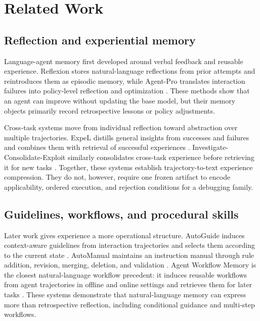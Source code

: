 \section{Related Work}
\label{sec:related_work}

\subsection{Reflection and experiential memory}
\label{sec:related_reflection}

Language-agent memory first developed around verbal feedback and reusable experience. Reflexion stores natural-language reflections from prior attempts and reintroduces them as episodic memory, while Agent-Pro translates interaction failures into policy-level reflection and optimization \cite{shinn2023reflexion,zhang2024agentpro}. These methods show that an agent can improve without updating the base model, but their memory objects primarily record retrospective lessons or policy adjustments.

Cross-task systems move from individual reflection toward abstraction over multiple trajectories. ExpeL distills general insights from successes and failures and combines them with retrieval of successful experiences \cite{zhao2024expel}. Investigate-Consolidate-Exploit similarly consolidates cross-task experience before retrieving it for new tasks \cite{qian2024ice}. Together, these systems establish trajectory-to-text experience compression. They do not, however, require one frozen artifact to encode applicability, ordered execution, and rejection conditions for a debugging family.

\subsection{Guidelines, workflows, and procedural skills}
\label{sec:related_procedural}

Later work gives experience a more operational structure. AutoGuide induces context-aware guidelines from interaction trajectories and selects them according to the current state \cite{fu2024autoguide}. AutoManual maintains an instruction manual through rule addition, revision, merging, deletion, and validation \cite{chen2024automanual}. Agent Workflow Memory is the closest natural-language workflow precedent: it induces reusable workflows from agent trajectories in offline and online settings and retrieves them for later tasks \cite{wang2025workflowmemory}. These systems demonstrate that natural-language memory can express more than retrospective reflection, including conditional guidance and multi-step workflows.


